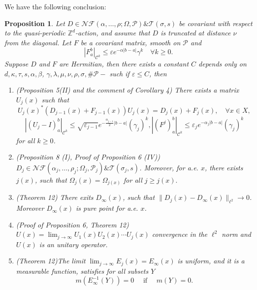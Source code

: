 \documentclass[11pt]{amsart}
\newtheorem{proposition}[theorem]{Proposition}
\theoremstyle{remark}
\theoremstyle{definition}
\newcommand{\Z}{{\mathbf Z}}
\def \Z{\mathcal{Z}}
\def\Z{{\mathbb Z}}
\begin{document}
We have the following conclusion:
\begin{proposition}\cite{E}\label{eli}
Let $D \in \mathcal{N} \mathcal{F}(\alpha, \ldots, \rho ; \Omega, \mathcal{P}) \& \mathcal{T}(\sigma, s)$ be covariant with respect to the quasi-periodic $\Z^d $-action, and assume that $D$ is truncated at distance $\nu$ from the diagonal. Let $F$ be a covariant matrix, smooth on $\mathcal{P}$ and
$$
\left|F_a^b\right|_{\mathcal{C}^k} \leq \varepsilon e^{-\alpha|b-a|} \gamma^k \quad \forall k \geq 0.
$$
Suppose $D$ and $F$ are Hermitian,
then there exists a constant $C$ depends only on $d , \kappa, \tau, s, \alpha, \beta$, $\gamma, \lambda, \mu, \nu, \rho, \sigma, \# \mathcal{P}-$ such if $\varepsilon \leq C$, then 

\begin{enumerate}
\item (Proposition 5(II) and the comment of Corollary 4)  There exists a matrix $U_j(x)$ such that
$$
U_j(x)^*(D_{j-1}(x)+F_{j-1}(x)) U_j(x)=D_j(x)+F_j(x), \quad \forall x \in X,
$$
$$
\left|(U_j-I)_a^b\right|_{\mathcal{C}^k} \leq \sqrt{\varepsilon_{j-1}} e^{-\frac{\alpha_{j-1}}{2}|b-a|}\left(\gamma_{j}\right)^k,\left|\left(F^{j}\right)_a^b\right|_{\mathcal{C}^k} \leq \varepsilon_j e^{-\alpha_j|b-a|}\left(\gamma_j\right)^k
$$
 for all $k \geq 0$.



\item (Proposition 8 (I), Proof of Proposition 6 (IV)) $D_j\in \mathcal{N} \mathcal{F}(\alpha_j, \ldots, \rho_j ; \Omega_j, \mathcal{P}_j) \& \mathcal{T}(\sigma_j, s)$. 
Moreover, for a.e. $x$, there exists $j(x)$, such that $\Omega_j(x)=\Omega_{j(x)}$ for all $j\geq j(x).$
    \item (Theorem 12)  There exits $D_{\infty}(x)$, such that $\|D_j(x)-D_{\infty}(x)\|_{\ell^2}\rightarrow0$. Moreover $D_{\infty}(x)$ is pure point for a.e. $x$.
\item (Proof of Proposition 6, Theorem 12) $U(x)=\lim_{j\rightarrow\infty}U_1(x)U_{2}(x)\cdots U_j(x)$ convergence in the $\ell^2$ norm and $U(x)$ is an unitary operator.

\item (Theorem 12)The limit $\lim _{j \rightarrow \infty} E_j(x)=E_{\infty}(x)$ is uniform, and it is a measurable function, satisfies for all subsets $Y$
$$
m(E_{\infty}^{-1}(Y))=0 \quad \text { if } \quad m(Y)=0.
$$



\end{enumerate}
\end{proposition}
\end{document}
